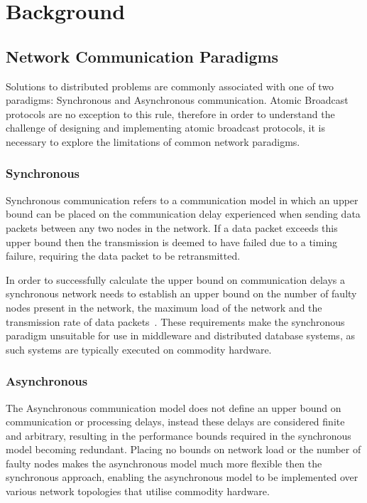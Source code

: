 
 \chapter{Background}

\ifpdf
    \graphicspath{{Chapter2-Background/Figs/Raster/}{Chapter2-Background/Figs/PDF/}{Chapter2-Background/Figs/}}
\else
    \graphicspath{{Chapter2-Background/Figs/Vector/}{Chapter2-Background/Figs/}}
\fi


\section[Network Communication Paradigms]{Network Communication Paradigms}
Solutions to distributed problems are commonly associated with one of two paradigms: Synchronous and Asynchronous communication. Atomic Broadcast protocols are no exception to this rule, therefore in order to understand the challenge of designing and implementing atomic broadcast protocols, it is necessary to explore the limitations of common network paradigms.  

	\subsection{Synchronous}
	Synchronous communication refers to a communication model in which an upper bound can be placed on the communication delay experienced when sending data packets between any two nodes in the network. If a data packet exceeds this upper bound then the transmission is deemed to have failed due to a timing failure, requiring the data packet to be retransmitted. 
	
	In order to successfully calculate the upper bound on communication delays a synchronous network needs to establish an upper bound on the number of faulty nodes present in the network, the maximum load of the network and the transmission rate of data packets~\cite{Cristian:1996:SA:227210.227231}. These requirements make the synchronous paradigm unsuitable for use in middleware and distributed database systems, as such systems are typically executed on commodity hardware.  
	 
	\subsection{Asynchronous}
	The Asynchronous communication model does not define an upper bound on communication or processing delays, instead these delays are considered finite and arbitrary, resulting in the performance bounds required in the synchronous model becoming redundant. Placing no bounds on network load or the number of faulty nodes makes the asynchronous model much more flexible then the synchronous approach, enabling the asynchronous model to be implemented over various network topologies that utilise commodity hardware. 

